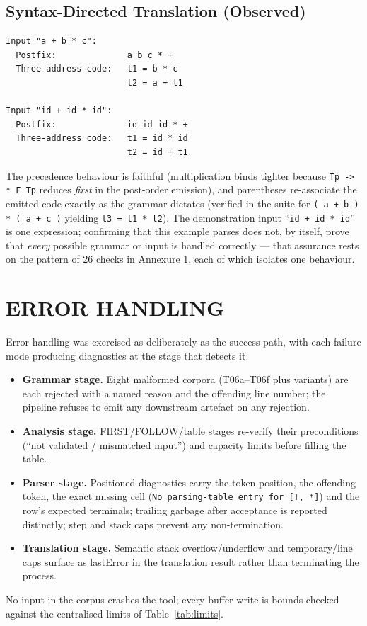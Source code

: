 \documentclass[12pt,a4paper,oneside,openany]{report}
\newcommand{\code}[1]{\texttt{#1}}
\begin{document}
\subsection{Syntax-Directed Translation (Observed)}
\begin{lstlisting}[style=outputcode,label=lst:sdtout,caption={Translation outputs as printed by the tool}]
Input "a + b * c":
  Postfix:              a b c * +
  Three-address code:   t1 = b * c
                        t2 = a + t1

Input "id + id * id":
  Postfix:              id id id * +
  Three-address code:   t1 = id * id
                        t2 = id + t1
\end{lstlisting}
The precedence behaviour is faithful (multiplication binds tighter
because \code{Tp -> * F Tp} reduces \emph{first} in the post-order
emission), and parentheses re-associate the emitted code exactly as the
grammar dictates (verified in the suite for \code{( a + b ) * ( a + c )}
yielding \code{t3 = t1 * t2}). The demonstration input ``\code{id + id *
id}'' is one expression; confirming that this example parses does not,
by itself, prove that \emph{every} possible grammar or input is handled
correctly --- that assurance rests on the pattern of 26 checks in
Annexure 1, each of which isolates one behaviour.

\section{ERROR HANDLING}
Error handling was exercised as deliberately as the success path, with
each failure mode producing diagnostics at the stage that detects it:

\begin{itemize}
  \item \textbf{Grammar stage.} Eight malformed corpora
        (T06a--T06f plus variants) are each rejected with a named reason
        and the offending line number; the pipeline refuses to emit any
        downstream artefact on any rejection.
  \item \textbf{Analysis stage.} FIRST/FOLLOW/table stages re-verify
        their preconditions (``not validated / mismatched input'') and
        capacity limits before filling the table.
  \item \textbf{Parser stage.} Positioned diagnostics carry the token
        position, the offending token, the exact missing cell
        (\code{No parsing-table entry for [T, *]}) and the row's expected
        terminals; trailing garbage after acceptance is reported
        distinctly; step and stack caps prevent any non-termination.
  \item \textbf{Translation stage.} Semantic stack overflow/underflow and
        temporary/line caps surface as lastError in the translation
        result rather than terminating the process.
\end{itemize}
No input in the corpus crashes the tool; every buffer write is bounds
checked against the centralised limits of Table~\ref{tab:limits}.
\end{document}
